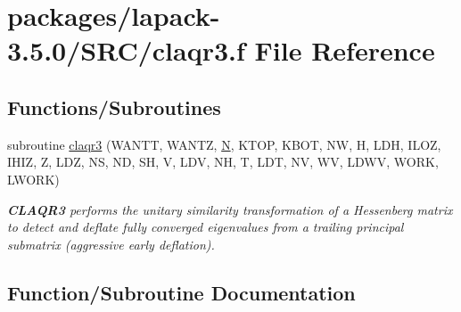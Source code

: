 \hypertarget{claqr3_8f}{}\section{packages/lapack-\/3.5.0/\+S\+R\+C/claqr3.f File Reference}
\label{claqr3_8f}
\subsection*{Functions/\+Subroutines}
\begin{DoxyCompactItemize}
\item 
subroutine \hyperlink{claqr3_8f_aa7abd9baec48ad30e2e28fc8cc236a1e}{claqr3} (W\+A\+N\+T\+T, W\+A\+N\+T\+Z, \hyperlink{polmisc_8c_a0240ac851181b84ac374872dc5434ee4}{N}, K\+T\+O\+P, K\+B\+O\+T, N\+W, H, L\+D\+H, I\+L\+O\+Z, I\+H\+I\+Z, Z, L\+D\+Z, N\+S, N\+D, S\+H, V, L\+D\+V, N\+H, T, L\+D\+T, N\+V, W\+V, L\+D\+W\+V, W\+O\+R\+K, L\+W\+O\+R\+K)
\begin{DoxyCompactList}\small\item\em {\bfseries C\+L\+A\+Q\+R3} performs the unitary similarity transformation of a Hessenberg matrix to detect and deflate fully converged eigenvalues from a trailing principal submatrix (aggressive early deflation). \end{DoxyCompactList}\end{DoxyCompactItemize}


\subsection{Function/\+Subroutine Documentation}
\hypertarget{claqr3_8f_aa7abd9baec48ad30e2e28fc8cc236a1e}{}
